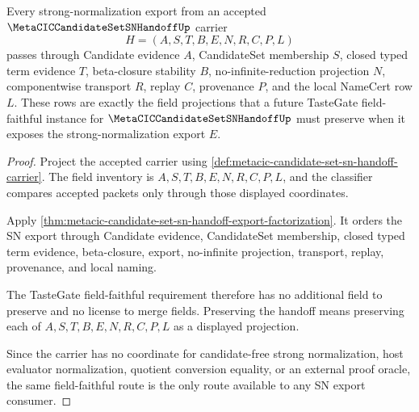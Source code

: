 \begin{theorem}
\label{thm:metacic-candidate-set-sn-handoff-tastegate-route}
Every strong-normalization export from an accepted $\MetaCICCandidateSetSNHandoffUp$ carrier
$$
H=(A,S,T,B,E,N,R,C,P,L)
$$
passes through Candidate evidence $A$, CandidateSet membership $S$, closed typed term evidence $T$, beta-closure stability $B$, no-infinite-reduction projection $N$, componentwise transport $R$, replay $C$, provenance $P$, and the local NameCert row $L$. These rows are exactly the field projections that a future TasteGate field-faithful instance for $\MetaCICCandidateSetSNHandoffUp$ must preserve when it exposes the strong-normalization export $E$.
\end{theorem}
\begin{proof}
Project the accepted carrier using \autoref{def:metacic-candidate-set-sn-handoff-carrier}. The field inventory is $A,S,T,B,E,N,R,C,P,L$, and the classifier compares accepted packets only through those displayed coordinates.

Apply \autoref{thm:metacic-candidate-set-sn-handoff-export-factorization}. It orders the SN export through Candidate evidence, CandidateSet membership, closed typed term evidence, beta-closure, export, no-infinite projection, transport, replay, provenance, and local naming.

The TasteGate field-faithful requirement therefore has no additional field to preserve and no license to merge fields. Preserving the handoff means preserving each of $A,S,T,B,E,N,R,C,P,L$ as a displayed projection.

Since the carrier has no coordinate for candidate-free strong normalization, host evaluator normalization, quotient conversion equality, or an external proof oracle, the same field-faithful route is the only route available to any SN export consumer.
\end{proof}



